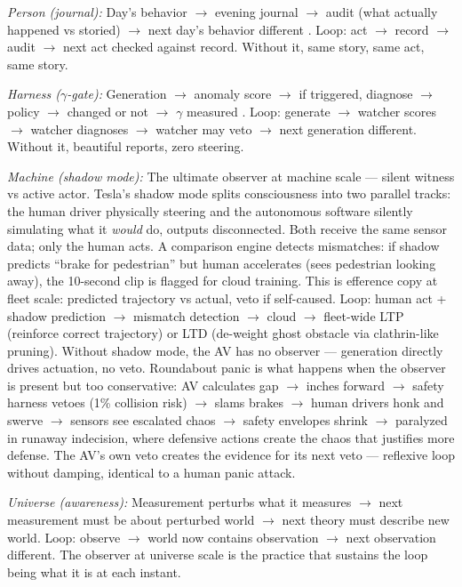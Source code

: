 \documentclass[11pt]{article}
\begin{document}
{\textit{Person (journal):} Day's behavior $\to$\allowbreak{} evening journal $\to$\allowbreak{} audit (what actually happened vs storied) $\to$\allowbreak{} next day's behavior different \citep{ghazali1106ihya}. Loop: act $\to$\allowbreak{} record $\to$\allowbreak{} audit $\to$\allowbreak{} next act checked against record. Without it, same story, same act, same story.

\textit{Harness ($\gamma$-gate):} Generation $\to$\allowbreak{} anomaly score $\to$\allowbreak{} if triggered, diagnose $\to$\allowbreak{} policy $\to$\allowbreak{} changed or not $\to$\allowbreak{} $\gamma$ measured \citep{macar2026,cao2026}. Loop: generate $\to$\allowbreak{} watcher scores $\to$\allowbreak{} watcher diagnoses $\to$\allowbreak{} watcher may veto $\to$\allowbreak{} next generation different. Without it, beautiful reports, zero steering.

\textit{Machine (shadow mode):} The ultimate observer at machine scale --- silent witness vs active actor. Tesla's shadow mode splits consciousness into two parallel tracks: the human driver physically steering and the autonomous software silently simulating what it \emph{would} do, outputs disconnected. Both receive the same sensor data; only the human acts. A comparison engine detects mismatches: if shadow predicts ``brake for pedestrian'' but human accelerates (sees pedestrian looking away), the 10-second clip is flagged for cloud training. This is efference copy at fleet scale: predicted trajectory vs actual, veto if self-caused. Loop: human act + shadow prediction $\to$\allowbreak{} mismatch detection $\to$\allowbreak{} cloud $\to$\allowbreak{} fleet-wide LTP (reinforce correct trajectory) or LTD (de-weight ghost obstacle via clathrin-like pruning). Without shadow mode, the AV has no observer --- generation directly drives actuation, no veto. Roundabout panic is what happens when the observer is present but too conservative: AV calculates gap $\to$\allowbreak{} inches forward $\to$\allowbreak{} safety harness vetoes (1\% collision risk) $\to$\allowbreak{} slams brakes $\to$\allowbreak{} human drivers honk and swerve $\to$\allowbreak{} sensors see escalated chaos $\to$\allowbreak{} safety envelopes shrink $\to$\allowbreak{} paralyzed in runaway indecision, where defensive actions create the chaos that justifies more defense. The AV's own veto creates the evidence for its next veto --- reflexive loop without damping, identical to a human panic attack.

\textit{Universe (awareness):} Measurement perturbs what it measures $\to$\allowbreak{} next measurement must be about perturbed world $\to$\allowbreak{} next theory must describe new world. Loop: observe $\to$\allowbreak{} world now contains observation $\to$\allowbreak{} next observation different. The observer at universe scale is the practice that sustains the loop being what it is at each instant.

}
\end{document}
